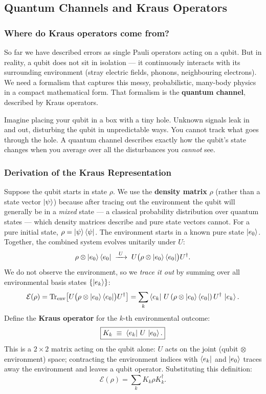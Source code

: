 \documentclass[11pt, a4paper]{article}
\theoremstyle{definition}
\theoremstyle{plain}
\theoremstyle{remark}
\newcommand{\Tr}{\operatorname{Tr}}
\begin{document}
\subsection{Quantum Channels and Kraus Operators}
\label{sec:kraus}

\subsubsection{Where do Kraus operators come from?}

So far we have described errors as single Pauli operators acting on a qubit.
But in reality, a qubit does not sit in isolation --- it continuously
interacts with its surrounding environment (stray electric fields, phonons,
neighbouring electrons).  We need a formalism that captures this messy,
probabilistic, many-body physics in a compact mathematical form.  That
formalism is the \textbf{quantum channel}, described by Kraus operators.

\begin{intuition}
Imagine placing your qubit in a box with a tiny hole.  Unknown signals leak
in and out, disturbing the qubit in unpredictable ways.  You cannot track
what goes through the hole.  A quantum channel describes exactly how the
qubit's state changes when you average over all the disturbances you
\emph{cannot} see.
\end{intuition}

\subsubsection{Derivation of the Kraus Representation}

Suppose the qubit starts in state $\rho$.  We use the \textbf{density
matrix} $\rho$ (rather than a state vector $\ket{\psi}$) because after
tracing out the environment the qubit will generally be in a \emph{mixed}
state --- a classical probability distribution over quantum states --- which
density matrices describe and pure state vectors cannot.  For a pure initial
state, $\rho = \ket{\psi}\bra{\psi}$.  The environment starts in a known
pure state $\ket{e_0}$.  Together, the combined system evolves unitarily
under $U$:
\[
  \rho \otimes \ket{e_0}\bra{e_0}
  \;\xrightarrow{\;U\;}\;
  U\bigl(\rho \otimes \ket{e_0}\bra{e_0}\bigr)U^\dagger.
\]
We do not observe the environment, so we \emph{trace it out} by summing
over all environmental basis states $\{\ket{e_k}\}$:
\[
  \mathcal{E}(\rho)
  = \Tr_{\mathrm{env}}\!\left[
      U\bigl(\rho \otimes \ket{e_0}\bra{e_0}\bigr)U^\dagger
    \right]
  = \sum_k \bra{e_k}\, U\,(\rho \otimes \ket{e_0}\bra{e_0})\,
           U^\dagger\,\ket{e_k}.
\]
Define the \textbf{Kraus operator} for the $k$-th environmental outcome:
\[
  \boxed{K_k \;\equiv\; \bra{e_k}\, U \,\ket{e_0}.}
\]
This is a $2\times2$ matrix acting on the qubit alone: $U$ acts on the
joint (qubit $\otimes$ environment) space; contracting the environment
indices with $\bra{e_k}$ and $\ket{e_0}$ traces away the environment and
leaves a qubit operator.  Substituting this definition:
\[
  \boxed{
  \mathcal{E}(\rho) = \sum_k K_k \rho K_k^\dagger.
  }
\]
\end{document}
